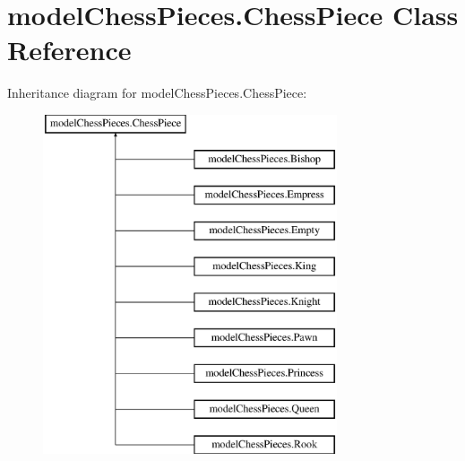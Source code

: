 \hypertarget{classmodel_chess_pieces_1_1_chess_piece}{\section{model\+Chess\+Pieces.\+Chess\+Piece Class Reference}
\label{classmodel_chess_pieces_1_1_chess_piece}
}
Inheritance diagram for model\+Chess\+Pieces.\+Chess\+Piece\+:\begin{figure}[H]
\begin{center}
\leavevmode
\includegraphics[height=10.000000cm]{classmodel_chess_pieces_1_1_chess_piece}
\end{center}
\end{figure}
